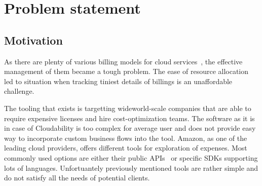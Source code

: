 \documentclass[licencjacka,en]{thesisclass}
\begin{document}

    \chapter{Problem statement}

    \section{Motivation}

    As there are plenty of various billing models for cloud services~\cite{GLaatikainen},
    the effective management of them became a tough problem.
    The ease of resource allocation led to situation when tracking tiniest details of billings is an unaffordable challenge.

    The tooling that exists is targetting wideworld-scale companies that are able to require expensive licenses and hire cost-optimization teams.
    The software as it is in case of Cloudability is too complex for average user and does not provide easy way to incorporate custom business flows into the tool.
    Amazon, as one of the leading cloud providers, offers different tools for exploration of expenses.
    Most commonly used options are either their public APIs~\cite{AWSCostManagement} or specific SDKs supporting lots of languages.
    Unfortuantely previously mentioned tools are rather simple and do not satisfy all the needs of potential clients.
\end{document}

